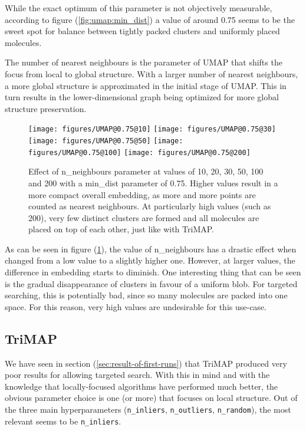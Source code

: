 While the exact optimum of this parameter is not objectively measurable, according to figure (\ref{fig:umap:min_dist}) a value of around 0.75 seems to be the sweet spot for balance between tightly packed clusters and uniformly placed molecules.

The number of nearest neighbours is the parameter of UMAP that shifts the focus from local to global structure. With a larger number of nearest neighbours, a more global structure is approximated in the initial stage of UMAP. This in turn results in the lower-dimensional graph being optimized for more global structure preservation.

\begin{figure}[!h]
	\centering
	\texttt{[image: figures/UMAP@0.75@10]}
	\texttt{[image: figures/UMAP@0.75@30]}
	\texttt{[image: figures/UMAP@0.75@50]}
	\texttt{[image: figures/UMAP@0.75@100]}
	\texttt{[image: figures/UMAP@0.75@200]}
	\caption{Effect of n\_neighbours parameter at values of 10, 20, 30, 50, 100 and 200 with a min\_dist parameter of 0.75. Higher values result in a more compact overall embedding, as more and more points are counted as nearest neighbours. At particularly high values (such as 200), very few distinct clusters are formed and all molecules are placed on top of each other, just like with TriMAP.}
	\label{fig:umap:n_neighbor}
\end{figure}

As can be seen in figure (\ref{fig:umap:n_neighbor}), the value of n\_neighbours has a drastic effect when changed from a low value to a slightly higher one. However, at larger values, the difference in embedding starts to diminish. One interesting thing that can be seen is the gradual disappearance of clusters in favour of a uniform blob. For targeted searching, this is potentially bad, since so many molecules are packed into one space. For this reason, very high values are undesirable for this use-case.

\subsection{TriMAP}

We have seen in section (\ref{sec:result-of-first-runs}) that TriMAP produced very poor results for allowing targeted search. With this in mind and with the knowledge that locally-focused algorithms have performed much better, the obvious parameter choice is one (or more) that focuses on local structure. Out of the three main hyperparameters (\texttt{n\_inliers}, \texttt{n\_outliers}, \texttt{n\_random}), the most relevant seems to be \texttt{n\_inliers}.

